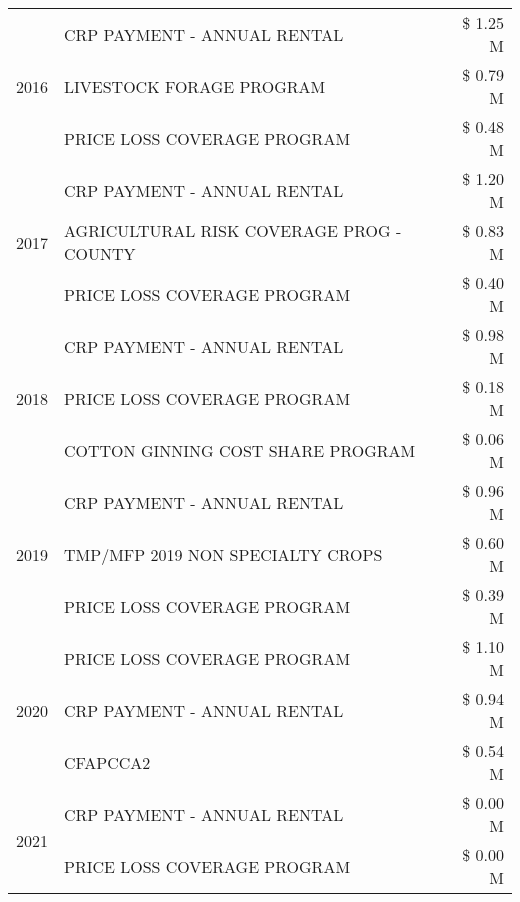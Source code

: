 \begin{tabular}{llr}
\cline{1-3}
\multirow[t]{3}{*}{2016} & CRP PAYMENT - ANNUAL RENTAL & \$ 1.25 M \\
 & LIVESTOCK FORAGE PROGRAM & \$ 0.79 M \\
 & PRICE LOSS COVERAGE PROGRAM & \$ 0.48 M \\
\cline{1-3}
\multirow[t]{3}{*}{2017} & CRP PAYMENT - ANNUAL RENTAL & \$ 1.20 M \\
 & AGRICULTURAL RISK COVERAGE PROG - COUNTY & \$ 0.83 M \\
 & PRICE LOSS COVERAGE PROGRAM & \$ 0.40 M \\
\cline{1-3}
\multirow[t]{3}{*}{2018} & CRP PAYMENT - ANNUAL RENTAL & \$ 0.98 M \\
 & PRICE LOSS COVERAGE PROGRAM & \$ 0.18 M \\
 & COTTON GINNING COST SHARE PROGRAM & \$ 0.06 M \\
\cline{1-3}
\multirow[t]{3}{*}{2019} & CRP PAYMENT - ANNUAL RENTAL & \$ 0.96 M \\
 & TMP/MFP 2019 NON SPECIALTY CROPS & \$ 0.60 M \\
 & PRICE LOSS COVERAGE PROGRAM & \$ 0.39 M \\
\cline{1-3}
\multirow[t]{3}{*}{2020} & PRICE LOSS COVERAGE PROGRAM & \$ 1.10 M \\
 & CRP PAYMENT - ANNUAL RENTAL & \$ 0.94 M \\
 & CFAPCCA2 & \$ 0.54 M \\
\cline{1-3}
\multirow[t]{2}{*}{2021} & CRP PAYMENT - ANNUAL RENTAL & \$ 0.00 M \\
 & PRICE LOSS COVERAGE PROGRAM & \$ 0.00 M \\
\cline{1-3}
\bottomrule
\end{tabular}
